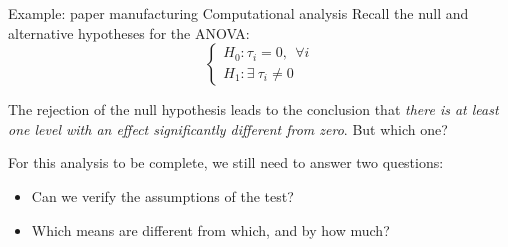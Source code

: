 \begin{frame}
{Example: paper manufacturing}
{Computational analysis}
Recall the null and alternative hypotheses for the ANOVA:
\begin{equation*}
\begin{cases}
H_0: \tau_i = 0,\ \ \forall i\\
H_1: \exists\ \tau_i \neq 0
\end{cases}
\end{equation*}

The rejection of the null hypothesis leads to the conclusion that \textit{there is at least one level with an effect significantly different from zero}. But which one?
\bigskip

For this analysis to be complete, we still need to answer two questions:
\begin{itemize}
  \item Can we verify the assumptions of the test?
  \item Which means are different from which, and by how much?
\end{itemize}
\end{frame}


